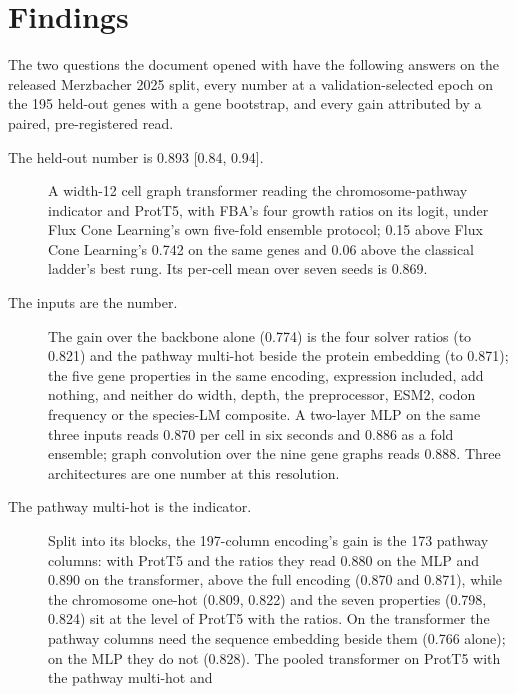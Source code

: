 
\section{Findings}
\label{sec:findings}

The two questions the document opened with have the following answers on the released
Merzbacher 2025 split, every number at a validation-selected epoch on the 195 held-out
genes with a gene bootstrap, and every gain attributed by a paired, pre-registered read.

\begin{description}
  \item[The held-out number is 0.893 {[0.84, 0.94]}.] A width-12 cell graph transformer
    reading the chromosome-pathway indicator and ProtT5, with FBA's four growth ratios on
    its logit, under Flux Cone Learning's own five-fold ensemble protocol; 0.15 above
    Flux Cone Learning's 0.742 on the same genes and 0.06 above the classical ladder's
    best rung. Its per-cell mean over seven seeds is 0.869.
  \item[The inputs are the number.] The gain over the backbone alone (0.774) is the four
    solver ratios (to 0.821) and the pathway multi-hot beside the protein embedding (to
    0.871); the five gene properties in the same encoding, expression included, add
    nothing, and neither do width, depth, the preprocessor, ESM2, codon frequency or the
    species-LM composite. A two-layer MLP on the same three inputs reads 0.870 per cell in
    six seconds and 0.886 as a fold ensemble; graph convolution over the nine gene graphs
    reads 0.888. Three architectures are one number at this resolution.
  \item[The pathway multi-hot is the indicator.] Split into its blocks, the 197-column
    encoding's gain is the 173 pathway columns: with ProtT5 and the ratios they read
    0.880 on the MLP and 0.890 on the transformer, above the full encoding (0.870 and
    0.871), while the chromosome one-hot (0.809, 0.822) and the seven properties
    (0.798, 0.824) sit at the level of ProtT5 with the ratios. On the transformer the
    pathway columns need the sequence embedding beside them (0.766 alone); on the MLP
    they do not (0.828). The pooled transformer on ProtT5 with the pathway multi-hot and

\end{description}
